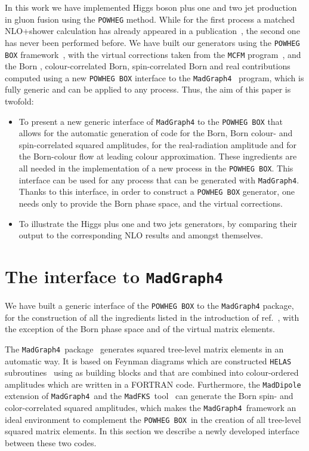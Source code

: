 \documentclass[paper]{JHEP3}
\newcommand\POWHEG{{\tt POWHEG}}
\newcommand\POWHEGBOX{{\tt POWHEG BOX}}
\newcommand\MG{{\tt MadGraph4}}
\newcommand\HELAS{{\tt HELAS}}
\newcommand\MCFM{{\tt MCFM}}
\newcommand\MadDipole{{\tt MadDipole}}
\newcommand\MadFKS{{\tt MadFKS}}
\begin{document}
In this work we have implemented Higgs boson plus one and two jet production
in gluon fusion using the \POWHEG{} method. While for the first process a
matched NLO+shower calculation has already appeared in a
publication~\cite{Hoeche:2011fd}, the second one has never been performed before.
We have built our generators using the \POWHEGBOX{}
framework~\cite{Alioli:2010xd}, with the virtual corrections taken from the
\MCFM{} program~\cite{MCFM}, and the Born , colour-correlated Born,
spin-correlated Born and real contributions computed using a new \POWHEGBOX{}
interface to the \MG{}~\cite{Stelzer:1994ta, Alwall:2007st} program, which is
fully generic and can be applied to any process. Thus, the aim of this paper
is twofold:
\begin{itemize}
\item To present a new generic interface of \MG{} to the \POWHEGBOX{} that
  allows for the automatic generation of code for the Born, Born colour- and
  spin-correlated squared amplitudes, for the real-radiation amplitude and for
  the Born-colour flow at leading colour approximation. These  ingredients
  are all needed in the implementation of a new process in the \POWHEGBOX{}. This
  interface can be used for any process that can be generated with \MG{}.
  Thanks to this interface, in order to construct a \POWHEGBOX{} generator,
  one needs only to provide the Born phase space, and the virtual
  corrections.
\item  To illustrate the Higgs plus one and two jets generators, by comparing
  their output to the corresponding NLO results and amongst themselves.
\end{itemize}





\section{The interface to \MG}
\label{sec:MGinterface}
We have built a generic interface of the \POWHEGBOX{} to the \MG{} package,
for the construction of all the ingredients listed in the introduction of
ref.~\cite{Alioli:2010xd}, with the exception of the Born phase space and of
the virtual matrix elements.

The \MG\ package~\cite{Stelzer:1994ta, Alwall:2007st} generates squared
tree-level matrix elements in an automatic way. It is based on Feynman
diagrams which are constructed \HELAS{} subroutines~\cite{Murayama:1992gi}
using as building blocks and that are combined into colour-ordered amplitudes
which are written in a FORTRAN code. Furthermore, the
\MadDipole~\cite{Frederix:2008hu,Frederix:2010cj,Gehrmann:2010ry} extension
of \MG\ and the \MadFKS\ tool~\cite{Frederix:2009yq} can generate the Born
spin- and color-correlated squared amplitudes, which makes the \MG\ framework
an ideal environment to complement the \POWHEGBOX\ in the creation of all
tree-level squared matrix elements. In this section we describe a newly
developed interface between these two codes.
\end{document}
